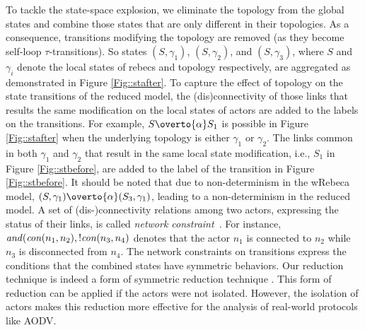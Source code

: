 To tackle the state-space explosion, we eliminate the topology from the global states and combine those states that are only different in their topologies. As a consequence, transitions modifying the topology are removed (as they become self-loop $\tau$-transitions). So states $(S,\gamma_1)$, $(S,\gamma_2)$, and $(S,\gamma_3)$, where $S$ and $\gamma_i$ denote the local states of rebecs and topology respectively, are aggregated as demonstrated in Figure \ref{Fig::stafter}. %
To capture the effect of topology on the state transitions of the reduced model, the (dis)connectivity of those links that results the same modification on the local states of actors %
are added to the labels on the transitions. For example, $S\overto{\alpha} S_1$ is possible in Figure \ref{Fig::stafter} when the underlying topology is either $\gamma_1$ or $\gamma_2$. The links common in both $\gamma_{1}$ and $\gamma_{2}$ that result in the same local state modification, i.e., $S_1$ in Figure \ref{Fig::stbefore}, are added to the label of the transition in Figure \ref{Fig::stbefore}. It should be noted that due to non-determinism in the wRebeca model, $(S,\gamma_1)\overto{\alpha}(S_3,\gamma_1)$, leading to a non-determinism in the reduced model. A set of (dis-)connectivity relations among two actors, expressing the status of their links, is called \emph{network constraint}~\cite{FatemehFI10,FatemehFI19}. For instance, ${\it and}({\it con}(n_1,n_2),!{\it con}(n_3,n_4)$ denotes that the actor  $n_1$ is connected to $n_2$ while $n_3$ is disconnected from $n_4$. The network constraints on transitions express the conditions that the combined states have symmetric behaviors. Our reduction technique is indeed a form of symmetric reduction technique \cite{clarke1998symmetry}. This form of reduction can be applied if the actors were not isolated. %
However, the isolation of actors makes this reduction more effective for the analysis of real-world protocols like AODV.  




